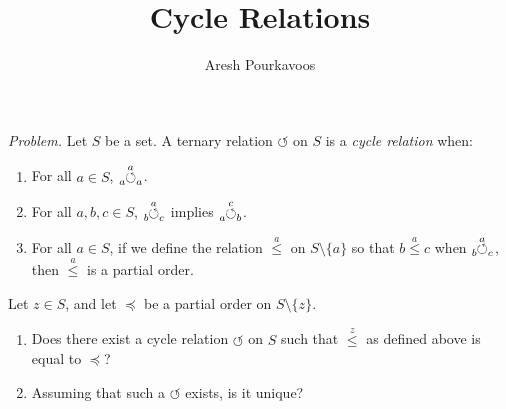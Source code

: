 \documentclass{article}
\newcommand{\ternary}[4]{\hspace{-1mm}\tensor[_{#3}]{\overset{#2}{#1}}{_{#4}}}
\newcommand{\cyc}[3]{\ternary{\circlearrowleft}{#1}{#2}{#3}}
\newcommand{\po}[1]{\overset{#1}{\leq}}
\begin{document}
\title{Cycle Relations}
\author{Aresh Pourkavoos}
\maketitle

\textit{Problem.} Let $S$ be a set.
A ternary relation $\circlearrowleft$ on $S$ is a \textit{cycle relation} when:
\begin{enumerate}[label=(\arabic*)]
\item
  For all $a \in S$, $\cyc{a}{a}{a}$.
\item
  For all $a, b, c \in S$, $\cyc{a}{b}{c}$ implies $\cyc{c}{a}{b}$.
\item
  For all $a \in S$, if we define the relation $\po{a}$ on $S \setminus \{a\}$
  so that $b \po{a} c$ when $\cyc{a}{b}{c}$,
  then $\po{a}$ is a partial order.
\end{enumerate}
Let $z \in S$, and let $\preceq$ be a partial order on $S \setminus \{z\}$.
\begin{enumerate}[label=(\roman*)]
\item
  Does there exist a cycle relation $\circlearrowleft$ on $S$
  such that $\po{z}$ as defined above is equal to $\preceq$?
\item
  Assuming that such a $\circlearrowleft$ exists, is it unique?
\end{enumerate}

\newpage
\end{document}
